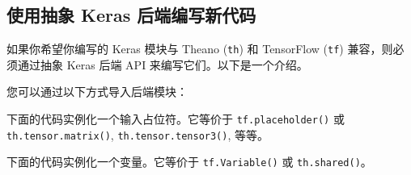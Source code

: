 \subsection{使用抽象 Keras
后端编写新代码}\label{ux4f7fux7528ux62bdux8c61-keras-ux540eux7aefux7f16ux5199ux65b0ux4ee3ux7801}

如果你希望你编写的 Keras 模块与 Theano (\texttt{th}) 和 TensorFlow
(\texttt{tf}) 兼容，则必须通过抽象 Keras 后端 API
来编写它们。以下是一个介绍。

您可以通过以下方式导入后端模块：

\begin{Shaded}
\begin{Highlighting}[]
   
\end{Highlighting}
\end{Shaded}

下面的代码实例化一个输入占位符。它等价于 \texttt{tf.placeholder()} 或
\texttt{th.tensor.matrix()}, \texttt{th.tensor.tensor3()}, 等等。

\begin{Shaded}
\begin{Highlighting}[]
\OperatorTok{=} \OperatorTok{=}\NormalTok{(}\NormalTok{, }\NormalTok{, }\NormalTok{))}
\OperatorTok{=} \OperatorTok{=}\NormalTok{(}\NormalTok{, }\NormalTok{, }\NormalTok{))}
\OperatorTok{=} \OperatorTok{=}\NormalTok{)}
\end{Highlighting}
\end{Shaded}

下面的代码实例化一个变量。它等价于 \texttt{tf.Variable()} 或
\texttt{th.shared()}。

\begin{Shaded}
\begin{Highlighting}[]
  
\OperatorTok{=} \NormalTok{, }\NormalTok{, }\NormalTok{))}
\OperatorTok{=} \OperatorTok{=}

\OperatorTok{=} \OperatorTok{=}\NormalTok{(}\NormalTok{, }\NormalTok{, }\NormalTok{))}
\OperatorTok{=} \OperatorTok{=}\NormalTok{(}\NormalTok{, }\NormalTok{, }\NormalTok{))}
\end{Highlighting}
\end{Shaded}

